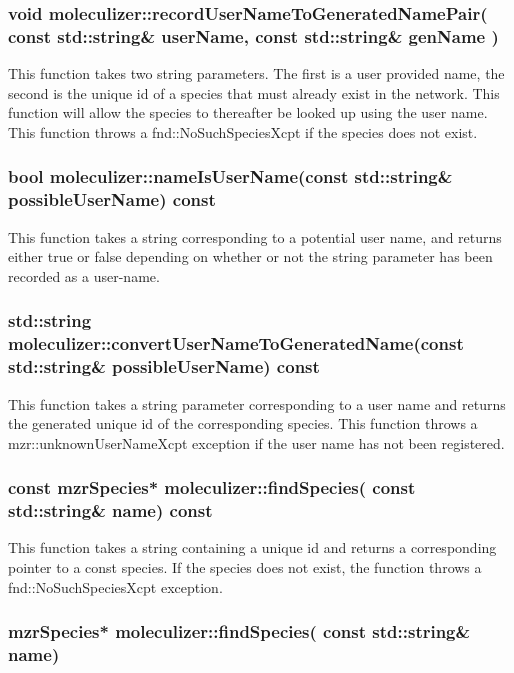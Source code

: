\subsubsection{void moleculizer::recordUserNameToGeneratedNamePair(
  const std::string\& userName,  const std::string\& genName )}

This function takes two string parameters.  The first is a user
provided name, the second is the unique id of a species that must
already exist in the network.  This function will allow the species to
thereafter be looked up using the user name.  This function throws a
fnd::NoSuchSpeciesXcpt if the species does not exist.  

\subsubsection{bool moleculizer::nameIsUserName(const std::string\&
  possibleUserName) const}
This function takes a string corresponding to a potential user name,
and returns either true or false depending on whether or not the
string parameter has been recorded as a user-name.  

\subsubsection{std::string
  moleculizer::convertUserNameToGeneratedName(const std::string\&
  possibleUserName) const}

This function takes a string parameter corresponding to a user name
and returns the generated unique id of the corresponding species.
This function throws a mzr::unknownUserNameXcpt exception if the user
name has not been registered.  

\subsubsection{ const mzrSpecies* moleculizer::findSpecies( const
  std::string\& name) const  }

This function takes a string containing a unique id and returns a
corresponding pointer to a const species.  If the species does not exist,
the function throws a fnd::NoSuchSpeciesXcpt exception.  


\subsubsection{ mzrSpecies* moleculizer::findSpecies( const
  std::string\& name) }

